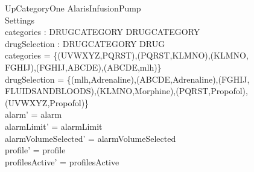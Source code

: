 \begin{schema}{UpCategoryOne}
	\Delta AlarisInfusionPump\\
	\pagebreak
	 Settings\\
	categories : DRUGCATEGORY \rel DRUGCATEGORY\\
	drugSelection : DRUGCATEGORY \rel DRUG\\
	\where
	categories = \{(UVWXYZ,PQRST),(PQRST,KLMNO),(KLMNO,\\
	FGHIJ),(FGHIJ,ABCDE),(ABCDE,mlh)\}\\
	drugSelection = \{(mlh,Adrenaline),(ABCDE,Adrenaline),(FGHIJ,\\
	FLUIDSANDBLOODS),(KLMNO,Morphine),(PQRST,Propofol),\\
	(UVWXYZ,Propofol)\}\\
	alarm' = alarm\\
	alarmLimit' = alarmLimit\\
	alarmVolumeSelected' = alarmVolumeSelected\\
	profile' = profile\\
	profilesActive' = profilesActive\\  
	  

\end{schema}
